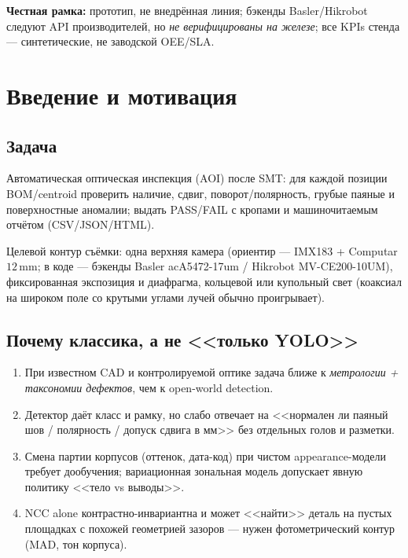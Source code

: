 \documentclass[12pt,a4paper]{article}
\begin{document}
\textbf{Честная рамка:} прототип, не внедрённая линия; бэкенды Basler/Hikrobot
следуют API производителей, но \emph{не верифицированы на железе}; все
KPIs стенда --- синтетические, не заводской OEE/SLA.

\section{Введение и мотивация}

\subsection{Задача}
Автоматическая оптическая инспекция (AOI) после SMT: для каждой позиции
BOM/centroid проверить наличие, сдвиг, поворот/полярность, грубые паяные
и поверхностные аномалии; выдать PASS/FAIL с кропами и машиночитаемым
отчётом (CSV/JSON/HTML).

Целевой контур съёмки: одна верхняя камера (ориентир --- IMX183 + Computar
\(12\,\mathrm{mm}\); в коде --- бэкенды Basler acA5472-17um /
Hikrobot MV-CE200-10UM), фиксированная экспозиция и диафрагма, кольцевой
или купольный свет (коаксиал на широком поле со крутыми углами лучей
обычно проигрывает).

\subsection{Почему классика, а не <<только YOLO>>}
\begin{enumerate}[leftmargin=1.5em]
  \item При известном CAD и контролируемой оптике задача ближе к
        \emph{метрологии + таксономии дефектов}, чем к open-world detection.
  \item Детектор даёт класс и рамку, но слабо отвечает на
        <<нормален ли паяный шов / полярность / допуск сдвига в мм>>
        без отдельных голов и разметки.
  \item Смена партии корпусов (оттенок, дата-код) при чистом appearance-модели
        требует дообучения; вариационная зональная модель допускает
        явную политику <<тело vs выводы>>.
  \item NCC alone контрастно-инвариантна и может <<найти>> деталь на пустых
        площадках с похожей геометрией зазоров --- нужен фотометрический
        контур (MAD, тон корпуса).
\end{enumerate}
\end{document}
